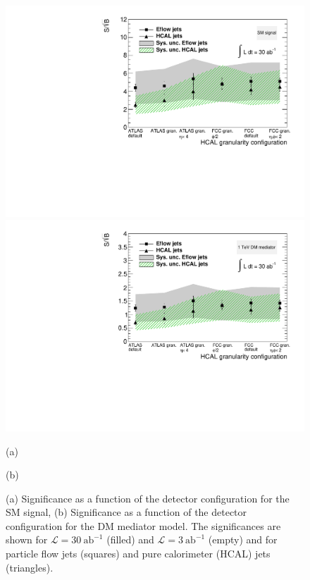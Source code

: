 \begin{figure}
	\centering
	\begin{minipage}{.5\textwidth}
		\centering
		\includegraphics[trim={.6cm 0 0 0},clip,width=\linewidth]{./Figures/SSBvsGran_SM.pdf}
	\end{minipage}%
	\begin{minipage}{.5\textwidth}
		\centering
		\includegraphics[trim={0 0 .6cm 0},clip,width=\linewidth]{./Figures/SSBvsGran_DM.pdf}
	\end{minipage}
	\begin{minipage}[t]{0.5\textwidth}
		\caption*{(a)}
	\end{minipage}%
	\hfill
	\begin{minipage}[t]{0.5\textwidth}
		\caption*{(b)}
	\end{minipage}
	\caption{(a) Significance as a function of the detector configuration for the SM signal, (b) Significance as a function of the detector configuration for the DM mediator model. The significances are shown for $\mathcal{L}=30~\text{ab}^{-1}$ (filled) and $\mathcal{L}=3~\text{ab}^{-1}$ (empty) and for particle flow jets (squares) and pure calorimeter (HCAL) jets (triangles).}
	\label{fig:SSBvsGran1}
\end{figure}

